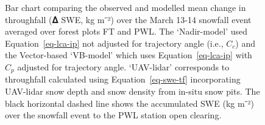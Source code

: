 \documentclass[
  letterpaper,
  DIV=11,
  numbers=noendperiod]{scrartcl}
\begin{document}
\begin{figure}[H]


\caption{\label{fig-event-tf}Bar chart comparing the observed and
modelled mean change in throughfall (𝚫 SWE, kg m⁻²) over the March 13-14
snowfall event averaged over forest plots FT and PWL. The `Nadir-model'
used Equation~\ref{eq-lca-ip} not adjusted for trajectory angle (i.e.,
\(C_c\)) and the Vector-based `VB-model' which uses
Equation~\ref{eq-lca-ip} with \(C_p\) adjusted for trajectory angle.
`UAV-lidar' corresponds to throughfall calculated using
Equation~\ref{eq-swe-tf} incorporating UAV-lidar snow depth and snow
density from in-situ snow pits. The black horizontal dashed line shows
the accumulated SWE (kg m⁻²) over the snowfall event to the PWL station
open clearing.}

\end{figure}%

\pagebreak
\end{document}
